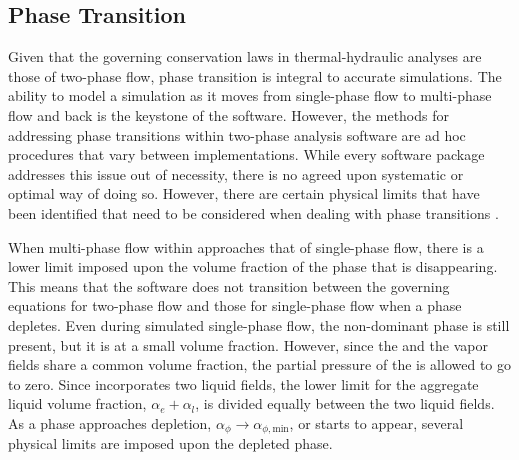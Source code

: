 \subsection{Phase Transition}
\label{subsect:nlnPhaseTransition}
Given that the governing conservation laws in thermal-hydraulic analyses are those of two-phase flow, phase transition is integral to accurate simulations.
The ability to model a simulation as it moves from single-phase flow to multi-phase flow and back is the keystone of the software.
However, the methods for addressing phase transitions within two-phase analysis software are ad hoc procedures that vary between implementations.
While every software package addresses this issue out of necessity, there is no agreed upon systematic or optimal way of doing so.
However, there are certain physical limits that have been identified that need to be considered when dealing with phase transitions \cite{Bestion2000}.

When multi-phase flow within \cobra{} approaches that of single-phase flow, there is a lower limit imposed upon the volume fraction of the phase that is disappearing.
This means that the software does not transition between the governing equations for two-phase flow and those for single-phase flow when a phase depletes.
Even during simulated single-phase flow, the non-dominant phase is still present, but it is at a small volume fraction.
However, since the \ncgs{} and the vapor fields share a common volume fraction, the partial pressure of the \ncgs{} is allowed to go to zero. 
Since \cobra{} incorporates two liquid fields, the lower limit for the aggregate liquid volume fraction, $\alpha_e + \alpha_l$, is divided equally between the two liquid fields.
As a phase approaches depletion, $\alpha_{\phi} \rightarrow \alpha_{\phi,\text{min}}$, or starts to appear, several physical limits are imposed upon the depleted phase.

